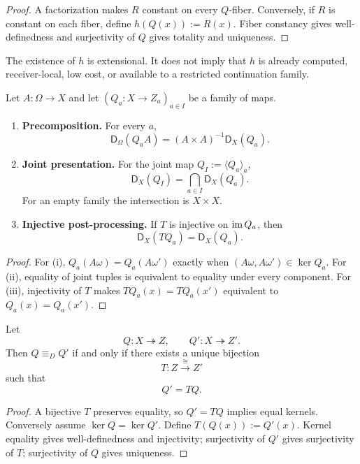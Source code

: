 \begin{proof}
A factorization makes $R$ constant on every $Q$-fiber. Conversely, if $R$ is constant on each fiber, define $h(Q(x)):=R(x)$. Fiber constancy gives well-definedness and surjectivity of $Q$ gives totality and uniqueness.
\end{proof}

The existence of $h$ is extensional. It does not imply that $h$ is already computed, receiver-local, low cost, or available to a restricted continuation family.

\begin{theorem}\label{thm:distinction-shadow-calculus-v13}
Let $A:\Omega\to X$ and let $(Q_a:X\to Z_a)_{a\in I}$ be a family of maps.
\begin{enumerate}[label=(\roman*)]
\item \textbf{Precomposition.} For every $a$,
\[
\boxed{\mathsf D_\Omega(Q_aA)=(A\times A)^{-1}\mathsf D_X(Q_a).}
\]
\item \textbf{Joint presentation.} For the joint map $Q_I:=\langle Q_a\rangle_a$,
\[
\boxed{\mathsf D_X(Q_I)=\bigcap_{a\in I}\mathsf D_X(Q_a).}
\]
For an empty family the intersection is $X\times X$.
\item \textbf{Injective post-processing.} If $T$ is injective on $\operatorname{im} Q_a$, then
\[
\boxed{\mathsf D_X(TQ_a)=\mathsf D_X(Q_a).}
\]
\end{enumerate}
\end{theorem}

\begin{proof}
For (i), $Q_a(A\omega)=Q_a(A\omega')$ exactly when $(A\omega,A\omega')\in\ker Q_a$. For (ii), equality of joint tuples is equivalent to equality under every component. For (iii), injectivity of $T$ makes $TQ_a(x)=TQ_a(x')$ equivalent to $Q_a(x)=Q_a(x')$.
\end{proof}

\begin{theorem}\label{thm:unique-conversion-v13}
Let
\[
Q:X\twoheadrightarrow Z,
\qquad
Q':X\twoheadrightarrow Z'.
\]
Then $Q\equiv_DQ'$ if and only if there exists a unique bijection
\[
T:Z\xrightarrow{\cong}Z'
\]
such that
\[
\boxed{Q'=TQ.}
\]
\end{theorem}

\begin{proof}
A bijective $T$ preserves equality, so $Q'=TQ$ implies equal kernels. Conversely assume $\ker Q=\ker Q'$. Define $T(Q(x)):=Q'(x)$. Kernel equality gives well-definedness and injectivity; surjectivity of $Q'$ gives surjectivity of $T$; surjectivity of $Q$ gives uniqueness.
\end{proof}

